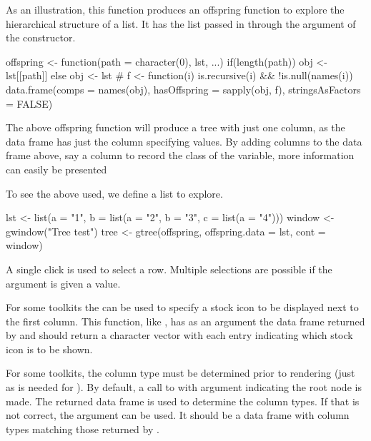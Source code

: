As an illustration, this function produces an offspring function to
explore the hierarchical structure of a list. It has the list passed
in through the
 argument of the constructor.
\begin{Schunk}
\begin{Sinput}
 offspring <- function(path = character(0), lst, ...) {
   if(length(path))
     obj <- lst[[path]]
   else
       obj <- lst
   #
   f <- function(i) is.recursive(i) && !is.null(names(i))
   data.frame(comps = names(obj), 
              hasOffspring = sapply(obj, f),
              stringsAsFactors = FALSE)
 }
\end{Sinput}
\end{Schunk}
%
The above offspring function will produce a tree with just one column,
as the data frame has just the  column specifying
values. By adding columns to the data frame above, say a column to
record the class of the variable, more information can easily be
presented

To see the above used, we define a list to explore.
\begin{Schunk}
\begin{Sinput}
 lst <- list(a = "1", b =  list(a = "2", b = "3", 
                        c = list(a = "4")))
 window <- gwindow("Tree test")
 tree <- gtree(offspring, offspring.data = lst, cont = window)
\end{Sinput}
\end{Schunk}


A single click is used to select a row. Multiple selections are
possible if the  argument is given a
 value.

For some toolkits the  can be used to
specify a stock icon to be displayed next to the first column. This
function, like , has as an argument the data frame
returned by  and should return a character vector with
each entry indicating which stock icon is to be shown.

For some toolkits, the column type must be determined prior to
rendering (just as is needed for ). By default, a call to  with argument
 indicating the root node is made. The returned data frame
is used to determine the column types. If that is not correct, the
argument  can be used. It should be a data
frame with column types matching those returned by .

